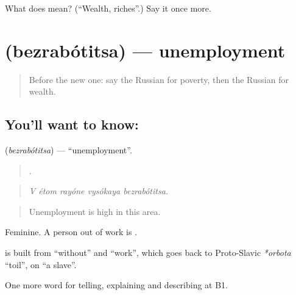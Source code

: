 \begin{tcolorbox}[breakable,colback=teal!4,colframe=teal!35!black,title={Before you move on}]
What does  mean? (\textquotedblleft{}Wealth, riches\textquotedblright{}.) Say it once more.
\end{tcolorbox}
\section[\texorpdfstring{\ru{безработица} (bezrabótitsa)}{безработица (bezrabótitsa)}]{ (bezrabótitsa) — unemployment}

\label{lesson:RU-C367-bezrabotica}



\begin{quote}
Before the new one: say the Russian for poverty, then the Russian for wealth.
\end{quote}

\subsection*{You'll want to know: }
\textbf{} (\emph{bezrabótitsa}) — \textquotedblleft{}unemployment\textquotedblright{}.

\begin{quote}
    .
\end{quote}

\begin{quote}
\emph{V étom rayóne vysókaya bezrabótitsa.}
\end{quote}

\begin{quote}
Unemployment is high in this area.
\end{quote}

Feminine. A person out of work is \emph{}.

\begin{cousinweb}
\textbf{} is built from \emph{} \textquotedblleft{}without\textquotedblright{} and \emph{} \textquotedblleft{}work\textquotedblright{}, which goes back to Proto-Slavic \emph{*orbota} \textquotedblleft{}toil\textquotedblright{}, on \emph{} \textquotedblleft{}a slave\textquotedblright{}.
\end{cousinweb}

\begin{grammarlens}[title={What you've built}]
One more word for telling, explaining and describing at B1.
\end{grammarlens}

